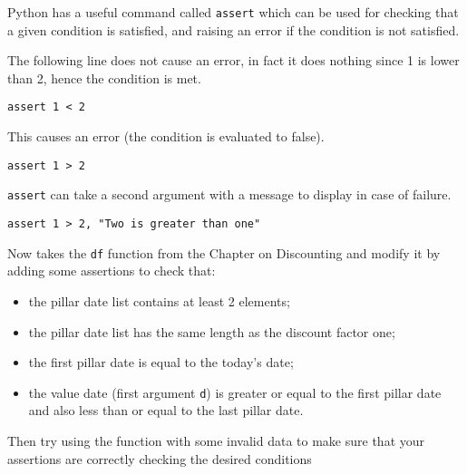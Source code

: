 \begin{question}
Python has a useful command called \texttt{assert} which can be used for checking that a given condition is satisfied, and raising an error if the condition is not satisfied.

The following line does not cause an error, in fact it does nothing since 1 is lower than 2, hence the condition is met.

\lstinline[language=iPython]|assert 1 < 2|

\noindent
This causes an error (the condition is evaluated to false). 

\lstinline[language=iPython]|assert 1 > 2|

\noindent
\texttt{assert} can take a second argument with a message to display in case of failure.

\lstinline[language=iPython]|assert 1 > 2, "Two is greater than one"|

\noindent
Now takes the \texttt{df} function from the Chapter on Discounting and modify it by adding some assertions to check that:

\begin{itemize}
\item the pillar date list contains at least 2 elements;
\item the pillar date list has the same length as the discount factor one;
\item the first pillar date is equal to the today's date;
\item the value date (first argument \texttt{d}) is greater or equal to the first pillar date and also less than or equal to the last pillar date.
\end{itemize}

Then try using the function with some invalid data to make sure that your assertions are correctly checking the desired conditions
\end{question}

\begin{solution}
\end{solution}

